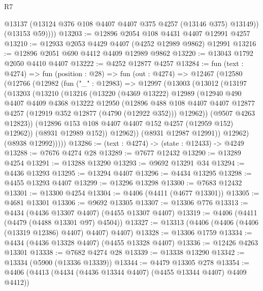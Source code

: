 \begin{lexlean}{R7}
\begin{coremodule}
            @13137
            (@13124 @376 @108 @4407 @4407 @375 @4257 (@13146 @375) @13149))
          (@13153 @59))))
@13203 := @12896 @2054 @108 @4431 @4407 @12991 @4257
@13210 := @12933 @2053 @4429 @4407 (@4252 @12989 @9862) @12991
@13216 := @12896 @2051 @690 @4412 @4409 @12989 @9862
@13220 := @13043 @1792 @2050 @4410 @4407
@13222 := @4252 @12877 @4257
@13284 := fun (text : @4274) =>
  fun (position : @28) =>
  fun (out : @4274) =>
  @12467
    (@12580
      (@12766
        (@12982
          (fun ("_" : @12983) =>
          @12997
            (@13003
              (@13012
                (@13197
                  (@13203
                    (@13210
                      (@13216
                        (@13220
                          (@4369 @13222)
                          @12989
                          (@12940
                            @490
                            @4407
                            @4409
                            @4368
                            @13222
                            @12950
                            (@12896
                              @488
                              @108
                              @4407
                              @4407
                              @12877
                              @4257
                              (@12919 @352 @12877 (@4790 (@12922 @352)))
                              @12962))
                          (@9507 @4263 @12823))
                        (@12896 @153 @108 @4407 @4407 @152 @4257 (@12959 @152) @12962))
                      (@8931 @12989 @152))
                    @12962))
                (@8931 @12987 @12991))
              @12962)
            (@8938 @12992)))))
@13286 := (text : @4274) -> (state : @12433) -> @4249
@13288 := @7676 @4274 @28
@13289 := @7677 @12432
@13290 := @13289 @4254
@13291 := @13288 @13290
@13293 := @9692 @13291 @34
@13294 := @4436 @13293
@13295 := @13294 @4407
@13296 := @4434 @13295
@13298 := @4455 @13293 @4407
@13299 := @13296 @13298
@13300 := @7683 @12432
@13301 := @13300 @4254
@13304 := @4406 (@4411 (@4677 @13301))
@13305 := @4681 @13301
@13306 := @9692 @13305
@13307 := @13306 @776
@13313 := @4434 (@4436 @13307 @4407) (@4455 @13307 @4407)
@13319 := @4406 (@4411 (@4479 (@4488 @13301 @97) @4504))
@13327 := @13313 (@4406 (@4406 (@4406 (@13319 @12386) @4407) @4407) @4407)
@13328 := @13306 @1759
@13334 := @4434 (@4436 @13328 @4407) (@4455 @13328 @4407)
@13336 := @12426 @4263 @13301
@13338 := @7682 @4274 @28
@13339 := @13338 @13290
@13342 := @13334 (@5900 (@13336 @13339))
@13344 := @4479 @13305 @278
@13354 := @4406 (@4413 (@4434 (@4436 @13344 @4407) (@4455 @13344 @4407) @4409 @4412))

\end{coremodule}
\end{lexlean}
